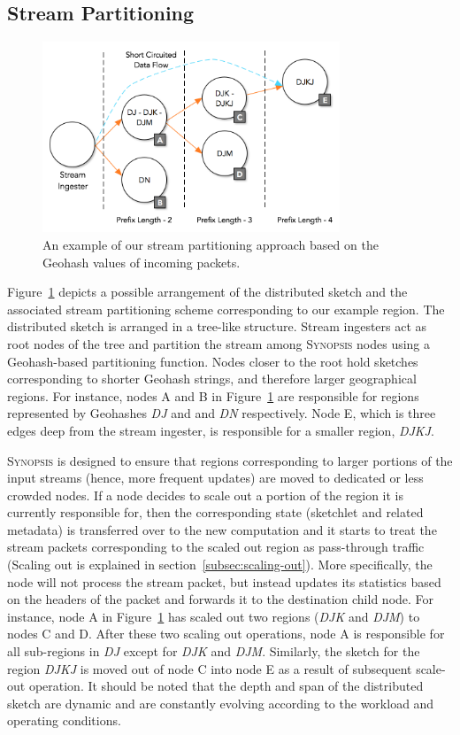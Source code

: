 \subsection{Stream Partitioning}
%
\begin{figure}[h!]
    \centerline{\includegraphics[width=3.5in]{figures/stream-partitioning.png}}
    \caption{An example of our stream partitioning approach based on the Geohash values of incoming packets.}
    \label{fig:stream-partitioning}
\end{figure}
%
Figure~\ref{fig:stream-partitioning} depicts a possible arrangement of the distributed sketch and the associated stream partitioning scheme corresponding to our example region.
The distributed sketch is arranged in a tree-like structure.
Stream ingesters act as root nodes of the tree and partition the stream among \textsc{Synopsis} nodes using a Geohash-based partitioning function.
Nodes closer to the root hold sketches corresponding to shorter Geohash strings, and therefore larger geographical regions.
For instance, nodes A and B in Figure~\ref{fig:stream-partitioning} are responsible for regions represented by Geohashes \emph{DJ} and and \emph{DN} respectively.
Node E, which is three edges deep from the stream ingester, is responsible for a smaller region, \emph{DJKJ}.

\textsc{Synopsis} is designed to ensure that regions corresponding to larger portions of the input streams (hence, more frequent updates) are moved to dedicated or less crowded nodes.
If a node decides to scale out a portion of the region it is currently responsible for, then the corresponding state (sketchlet and related metadata) is transferred over to the new computation and it starts to treat the stream packets corresponding to the scaled out region as pass-through traffic (Scaling out is explained in section~\ref{subsec:scaling-out}).
More specifically, the node will not process the stream packet, but instead updates its statistics based on the headers of the packet and forwards it to the destination child node. 
For instance, node A in Figure~\ref{fig:stream-partitioning} has scaled out two regions (\emph{DJK} and \emph{DJM}) to nodes C and D.
After these two scaling out operations, node A is responsible for all sub-regions in \emph{DJ} except for \emph{DJK} and \emph{DJM}.
Similarly, the sketch for the region \emph{DJKJ} is moved out of node C into node E as a result of subsequent scale-out operation.
It should be noted that the depth and span of the distributed sketch are dynamic and are constantly evolving according to the workload and operating conditions.

